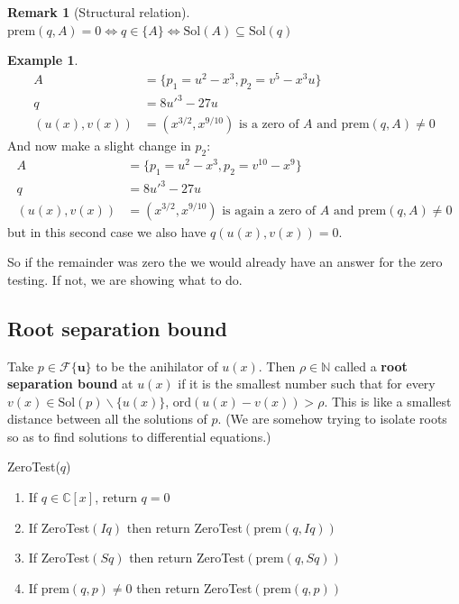 \documentclass{article}
\theoremstyle{definition}
\newtheorem*{obs}{Remark}
\newtheorem{ex}{Example}
\newcommand{\N}{\mathbb{N}}
\newcommand{\Sol}{\text{Sol}}
\begin{document}
\begin{obs}[Structural relation]
    $\text{prem}(q,A)=0\iff q\in\{A\}\iff\Sol(A)\subseteq\Sol(q)$
\end{obs}
\begin{ex}
\begin{align*}
        A&=\{p_1=u^2-x^3,p_2=v^5-x^3u\}\\
        q&=8u'^3-27u\\
        (u(x),v(x))&=(x^{3/2},x^{9/10})\text{ is a zero of }A\text{ and prem}(q,A)\neq0
\end{align*}
And now make a slight change in $p_2$:
\begin{align*}
        A&=\{p_1=u^2-x^3,p_2=v^{10}-x^9\}\\
        q&=8u'^3-27u\\
        (u(x),v(x))&=(x^{3/2},x^{9/10})\text{ is again a zero of }A\text{ and prem}(q,A)\neq0
\end{align*}
but in this second case we also have $q(u(x),v(x))=0$.
\end{ex}
So if the remainder was zero the we would already have an answer for the zero testing. If not, we are showing what to do.
\subsection{Root separation bound}
Take $p\in \mathcal F\{\mathbf{u}\}$ to be the anihilator of $u(x)$. Then $\rho\in\N$ called a \textbf{root separation bound} at $u(x)$ if it is the smallest number such that for every $v(x)\in\Sol(p)\backslash\{u(x)\}$, $\text{ord}(u(x)-v(x))>\rho$. This is like a smallest distance between all the solutions of $p$. (We are somehow trying to isolate roots so as to find solutions to differential equations.)

\begin{algorithm}[H]
\caption{ZeroTest($q$)}
	

 		\begin{enumerate}
 		    \item If $q \in \mathbb{C}[x]$, return $q = 0$
\item If ZeroTest$(Iq)$ then return ZeroTest$(\text{prem}(q,Iq))$
\item If ZeroTest$(Sq)$ then return ZeroTest$(\text{prem}(q,Sq))$
\item If $\text{prem}(q, p) \neq 0$ then return ZeroTest$(\text{prem}(q, p))$
 		\end{enumerate}
	\;
\end{algorithm}
\end{document}
